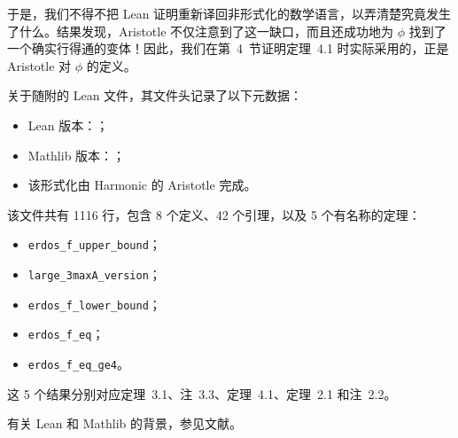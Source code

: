 \documentclass[UTF8,a4paper,oneside,openany,fontset=fandol,zihao=-4]{ctexbook}
\theoremstyle{chinesestyle}
\begin{document}
于是，我们不得不把 Lean 证明重新译回非形式化的数学语言，以弄清楚究竟发生了什么。结果发现，Aristotle 不仅注意到了这一缺口，而且还成功地为 $\phi$ 找到了一个确实行得通的变体！因此，我们在第~4~节证明定理~4.1 时实际采用的，正是 Aristotle 对 $\phi$ 的定义。

关于随附的 Lean 文件\cite{ref6}，其文件头记录了以下元数据：
\begin{itemize}
  \item Lean 版本：；
  \item Mathlib 版本：；
  \item 该形式化由 Harmonic 的 Aristotle 完成。
\end{itemize}
该文件共有 1116 行，包含 8 个定义、42 个引理，以及 5 个有名称的定理：
\begin{itemize}
  \item \texttt{erdos\_f\_upper\_bound}；
  \item \texttt{large\_3maxA\_version}；
  \item \texttt{erdos\_f\_lower\_bound}；
  \item \texttt{erdos\_f\_eq}；
  \item \texttt{erdos\_f\_eq\_ge4}。
\end{itemize}
这 5 个结果分别对应定理~3.1、注~3.3、定理~4.1、定理~2.1 和注~2.2。

有关 Lean 和 Mathlib 的背景，参见文献\cite{ref5,ref13}。
\end{document}
